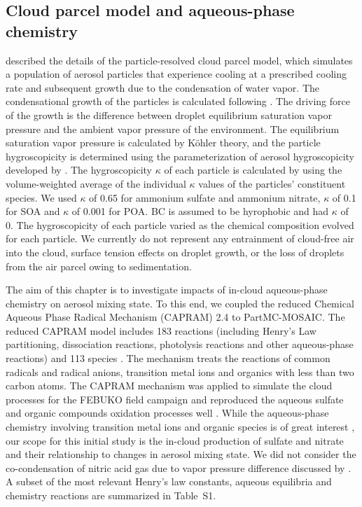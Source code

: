 \documentclass[edeposit,fullpage]{uiucthesis2009}
\begin{document}
\subsection{Cloud parcel model and aqueous-phase chemistry}
\citet{ching2012impacts} described the details of the particle-resolved cloud
parcel model, which simulates a population of aerosol particles that
experience cooling at a prescribed cooling rate and subsequent growth
due to the condensation of water vapor. The condensational growth of
the particles is calculated following \citet{Seinfeld2016}. The
driving force of the growth is the difference between droplet
equilibrium saturation vapor pressure and the ambient vapor pressure
of the environment. The equilibrium saturation vapor pressure is
calculated by K\"ohler theory, and the particle hygroscopicity is
determined using the parameterization of aerosol hygroscopicity
developed by \citet{Petters2007}. The hygroscopicity $\kappa$
  of each particle is calculated by using the volume-weighted average
  of the individual $\kappa$ values of the particles' constituent
  species. We used $\kappa$ of 0.65 for ammonium sulfate and ammonium nitrate,
  $\kappa$ of 0.1 for SOA and $\kappa$ of 0.001 for POA.  BC is
  assumed to be hyrophobic and had $\kappa$ of 0.  The hygroscopicity
  of each particle varied as the chemical composition evolved for each
  particle. We currently do not represent any entrainment of
cloud-free air into the cloud, surface tension effects on droplet
growth, or the loss of droplets from the air parcel owing to
sedimentation.

The aim of this chapter is to investigate impacts of in-cloud
aqueous-phase chemistry on aerosol mixing state. To this end, we
coupled the reduced Chemical Aqueous Phase Radical Mechanism (CAPRAM)
2.4 to PartMC-MOSAIC. The reduced CAPRAM model includes 183 reactions
(including Henry's Law partitioning, dissociation reactions,
photolysis reactions and other aqueous-phase reactions) and 113
species \citep{ervens2003capram}. The mechanism
treats the reactions of common radicals and radical anions, transition
metal ions and organics with less than two carbon atoms. The CAPRAM
mechanism was applied to simulate the cloud processes for the FEBUKO
field campaign and reproduced the aqueous sulfate and organic
compounds oxidation processes well \citep{Tilgner2005, Wolke2005}.
While the aqueous-phase chemistry involving transition metal ions and
organic species is of great interest
\citep{Mayol-Bracero2002,Harris2013a, Alexander2009, Lian2019,
    McNeill2015a, Smith2014, wonaschuetz2012aerosol,wagner2015situ},
our scope for this initial study is the in-cloud production of
  sulfate and nitrate and their relationship to changes in aerosol
  mixing state. We did not consider the co-condensation of nitric acid
  gas due to vapor pressure difference discussed by
  \citet{crooks2018parameterisation}. A subset of the most relevant
Henry's law constants, aqueous equilibria and chemistry reactions are summarized
in Table~S1.
\end{document}
